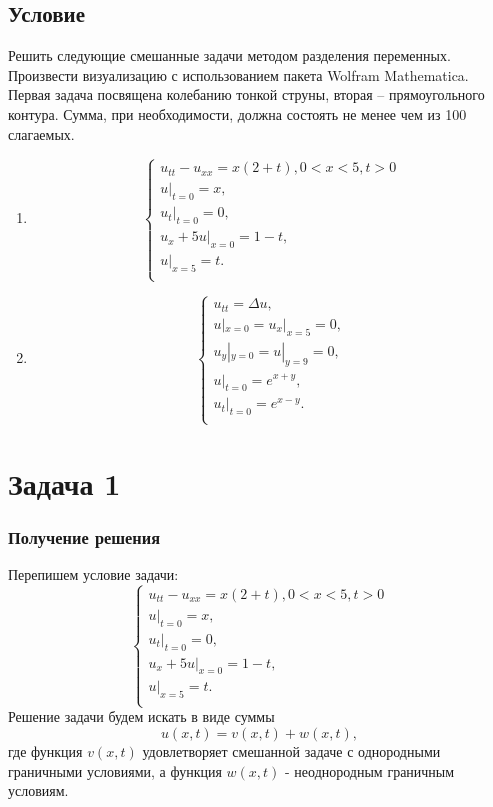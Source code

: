 \documentclass[11pt]{article}
\begin{document}
\begin{center}
    \section*{Условие}
\end{center}
Решить следующие смешанные задачи методом разделения переменных. Произвести
визуализацию с использованием пакета Wolfram Mathematica. Первая задача посвящена
колебанию тонкой струны, вторая – прямоугольного контура. Сумма, при необходимости,
должна состоять не менее чем из 100 слагаемых.
\begin{enumerate}
    \item$$
        \begin{cases}
            u_{tt}-u_{xx}=x(2+t),0 < x < 5, t>0\\
            u|_{t=0}=x,\\
            u_t|_{t=0}=0,\\
            u_x+5u|_{x=0} = 1-t,\\
            u|_{x=5}=t.\\
        \end{cases}$$
    \item$$
        \begin{cases}
            u_{tt}=\Delta u,\\
            u|_{x=0}=u_x|_{x=5}=0,\\
            u_y|_{y=0}=u|_{y=9}=0,\\
            u|_{t=0} = e^{x+y},\\
            u_t|_{t=0}=e^{x-y}.\\
        \end{cases}$$
\end{enumerate}
\newpage
\section*{Задача 1}
\subsubsection*{Получение решения}
Перепишем условие задачи:
$$\begin{cases}
    u_{tt}-u_{xx}=x(2+t),0 < x < 5, t>0\\
    u|_{t=0}=x,\\
    u_t|_{t=0}=0,\\
    u_x+5u|_{x=0} = 1-t,\\
    u|_{x=5}=t.\\
\end{cases}$$
Решение задачи будем искать в виде суммы $$u(x,t)=v(x,t)+w(x,t),$$ где функция $v(x,t)$ удовлетворяет смешанной задаче с однородными граничными условиями, а функция $w(x,t)$ - неоднородным граничным условиям.
\end{document}

